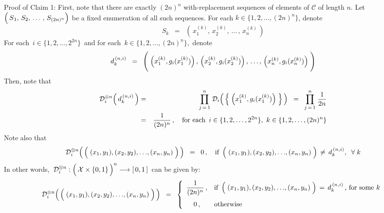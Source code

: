 \vskip 1.0cm
\noindent
Proof of Claim 1:\quad
First, note that there are exactly $(2n)^{n}$ with-replacement sequences of elements of $\mathcal{C}$
of length $n$.
Let $\left(\,\overset{{\color{white}.}}{S}_{1},\,S_{2},\,\ldots\,,\,S_{(2n)^{n}}\right)$ be a fixed enumeration
of all such sequences.
For each $k \in \{1, 2, \ldots, (2n)^{n}\}$, denote
\begin{equation*}
S_{k}
\;\; = \;\;
	\left(\, x^{(k)}_{1} ,\, x^{(k)}_{2} ,\, \ldots\, ,\, x^{(k)}_{n} \,\right)
\end{equation*}
For each \,$i \in\{1, 2, \ldots, 2^{2n}\}$\, and for each \,$k \in \{1, 2, \ldots, (2n)^{n}\}$,\, denote
\begin{equation*}
d^{\,(n,i)}_{k}
\;\; = \;\;
	\left(\;
		\left(x^{(k)}_{1},g_{i}(x^{(k)}_{1})\right) ,\,
		\left(x^{(k)}_{2},g_{i}(x^{(k)}_{2})\right) ,\,
		\overset{{\color{white}\textnormal{\Large$\vert$}}}{\ldots}\,,\,
		\left(x^{(k)}_{n},g_{i}(x^{(k)}_{n})\right)
	\;\right)
\end{equation*}
Then, note that
\begin{eqnarray*}
\mathcal{D}_{i}^{\otimes n}\!\left(\,d^{\,(n,i)}_{k}\,\right)
& = &
	\overset{n}{\underset{j\,=\,1}{\prod}}\;
	\mathcal{D}_{i}\!\left(\,\left\{\;\left(x^{(k)}_{1},g_{i}(x^{(k)}_{1})\right)\;\right\}\,\right)
\;\; = \;\;
	\overset{n}{\underset{j\,=\,1}{\prod}}\; \dfrac{1}{2n}
\\
& = &
	\dfrac{1}{(2n)^{n}}\,,
	\quad
	\textnormal{for each \,$i \in\{1, 2, \ldots, 2^{2n}\}$,\, $k \in \{1, 2, \ldots, (2n)^{n}\}$}
\end{eqnarray*}
Note also that
\begin{equation*}
\mathcal{D}_{i}^{\otimes n}\!\left(\,\left(\;(x_{1},y_{1}),(x_{2},y_{2}),\overset{{\color{white}\vert}}{\ldots},(x_{n},y_{n})\;\right)\,\right)
\;\; = \;\; 0\,,
\quad
\textnormal{if \,$\left(\;(x_{1},y_{1}),(x_{2},y_{2}),\overset{{\color{white}\vert}}{\ldots},(x_{n},y_{n})\;\right) \,\neq\, d^{\,(n,i)}_{k},
\;\;\forall\; k$}
\end{equation*}
In other words,
\,$\mathcal{D}^{\otimes n}_{i} : \left(\,\mathcal{X} \overset{{\color{white}.}}{\times} \{0,1\}\,\right)^{n} \longrightarrow [\,0,1\,]$\,
can be given by:
\begin{equation*}
\mathcal{D}_{i}^{\otimes n}\!\left(\,\left(\;(x_{1},y_{1}),(x_{2},y_{2}),\overset{{\color{white}\vert}}{\ldots},(x_{n},y_{n})\;\right)\,\right)
\;\; = \;\;
	\left\{\begin{array}{cl}
	\dfrac{1}{(2n)^{n}}\,, & \textnormal{if \,$\left(\;(x_{1},y_{1}),(x_{2},y_{2}),\overset{{\color{white}\vert}}{\ldots},(x_{n},y_{n})\;\right)\,=\, d^{\,(n,i)}_{k}$\,, for some $k$}
	\\
	\overset{{\color{white}\vert}}{0}\,, & \textnormal{otherwise}
	\end{array}\right.
\end{equation*}
